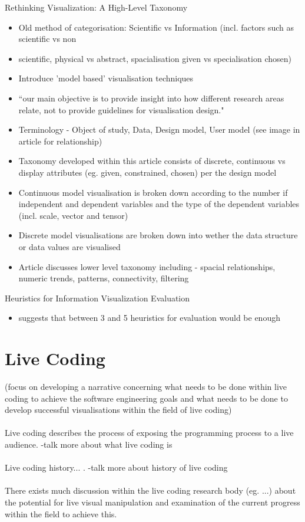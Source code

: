 Rethinking Visualization: A High-Level Taxonomy
\begin{itemize}
\item Old method of categorisation: Scientific vs Information (incl. factors such as scientific vs non\item scientific, physical vs abstract, spacialisation given vs specialisation chosen)
\item Introduce 'model based' visualisation techniques
\item “our main objective is to provide insight into how different research areas relate, not to provide guidelines for visualisation design."
\item Terminology - Object of study, Data, Design model, User model (see image in article for relationship)
\item Taxonomy developed within this article consists of {discrete, continuous} vs display attributes (eg. given, constrained, chosen) per the design model
\item Continuous model visualisation is broken down according to the number if independent and dependent variables and the type of the dependent variables (incl. scale, vector and tensor)
\item Discrete model visualisations are broken down into wether the data structure or data values are visualised

\item Article discusses lower level taxonomy including - spacial relationships, numeric trends, patterns, connectivity, filtering
\end{itemize}

Heuristics for Information Visualization Evaluation
\begin{itemize}
\item suggests that between 3 and 5 heuristics for evaluation would be enough
\end{itemize}

\section{Live Coding}
\label{sec:livecoding}

(focus on developing a narrative concerning what needs to be done within live coding to achieve the software engineering goals and what needs to be done to develop successful visualisations within the field of live coding)
\\\\
Live coding describes the process of exposing the programming process to a live audience. -talk more about what live coding is
\\\\
Live coding history... . -talk more about history of live coding
\\\\
There exists much discussion within the live coding research body (eg. ...) about the potential for live visual manipulation and examination of the current progress within the field to achieve this.


